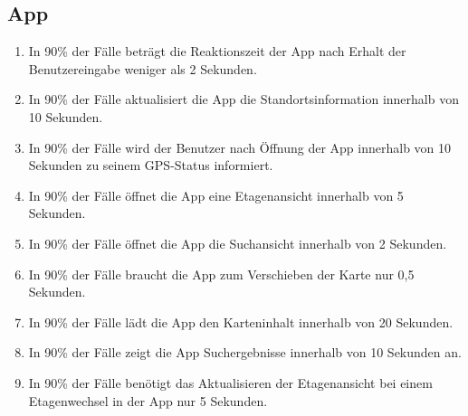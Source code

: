 \subsection*{App}

\begin{enumerate}
    \item In 90\% der Fälle beträgt die \Gls{Reaktionszeit} der App nach Erhalt der \Gls{Benutzereingabe} weniger als 2 Sekunden.
    \item In 90\% der Fälle aktualisiert die App die Standortsinformation innerhalb von 10 Sekunden.
    \item In 90\% der Fälle wird der \Gls{Benutzer} nach Öffnung der App innerhalb von 10 Sekunden zu seinem \Gls{GPS}-Status informiert.
    \item In 90\% der Fälle öffnet die App eine \Gls{Etagenansicht} innerhalb von 5 Sekunden.
    \item In 90\% der Fälle öffnet die App die \Gls{Suchansicht} innerhalb von 2 Sekunden.
    \item In 90\% der Fälle braucht die App zum Verschieben der \Gls{Karte} nur 0,5 Sekunden.
    \item In 90\% der Fälle lädt die App den Karteninhalt innerhalb von 20 Sekunden.
    \item In 90\% der Fälle zeigt die App Suchergebnisse innerhalb von 10 Sekunden an.
    \item In 90\% der Fälle benötigt das Aktualisieren der \Gls{Etagenansicht} bei einem \Gls{Etagenwechsel} in der App nur 5 Sekunden.
\end{enumerate}